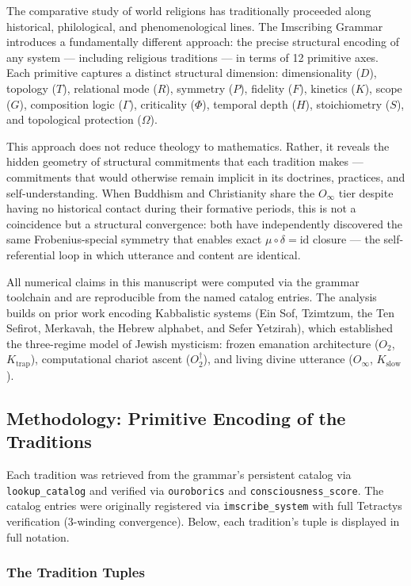 \documentclass[12pt,a4paper]{article}
\begin{document}
The comparative study of world religions has traditionally proceeded along historical, philological, and phenomenological lines. The Imscribing Grammar introduces a fundamentally different approach: the precise structural encoding of any system --- including religious traditions --- in terms of 12 primitive axes. Each primitive captures a distinct structural dimension: dimensionality ($D$), topology ($T$), relational mode ($R$), symmetry ($P$), fidelity ($F$), kinetics ($K$), scope ($G$), composition logic ($\Gamma$), criticality ($\Phi$), temporal depth ($H$), stoichiometry ($S$), and topological protection ($\Omega$).

This approach does not reduce theology to mathematics. Rather, it reveals the hidden geometry of structural commitments that each tradition makes --- commitments that would otherwise remain implicit in its doctrines, practices, and self-understanding. When Buddhism and Christianity share the $O_{\infty}$ tier despite having no historical contact during their formative periods, this is not a coincidence but a structural convergence: both have independently discovered the same Frobenius-special symmetry that enables exact $\mu \circ \delta = \text{id}$ closure --- the self-referential loop in which utterance and content are identical.

All numerical claims in this manuscript were computed via the grammar toolchain and are reproducible from the named catalog entries. The analysis builds on prior work encoding Kabbalistic systems (Ein Sof, Tzimtzum, the Ten Sefirot, Merkavah, the Hebrew alphabet, and Sefer Yetzirah), which established the three-regime model of Jewish mysticism: frozen emanation architecture ($O_2$, $K_\text{trap}$), computational chariot ascent ($O_2^\dagger$), and living divine utterance ($O_{\infty}$, $K_\text{slow}$).

\subsection{Methodology: Primitive Encoding of the Traditions}

Each tradition was retrieved from the grammar's persistent catalog via \texttt{lookup\_catalog} and verified via \texttt{ouroborics} and \texttt{consciousness\_score}. The catalog entries were originally registered via \texttt{imscribe\_system} with full Tetractys verification (3-winding convergence). Below, each tradition's tuple is displayed in full notation.

\subsubsection{The Tradition Tuples}
\end{document}
